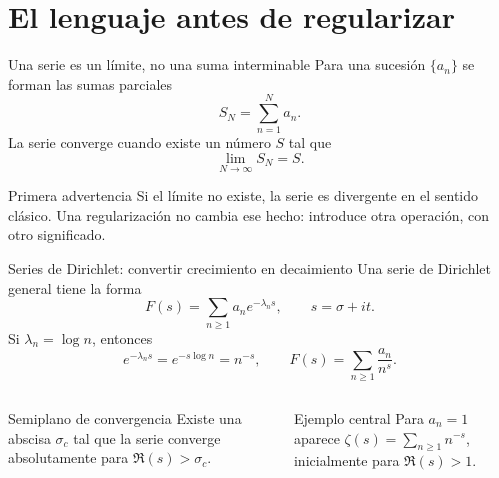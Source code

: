 \documentclass[aspectratio=169,11pt]{beamer}
\begin{document}
\section{El lenguaje antes de regularizar}

\begin{frame}{Una serie es un límite, no una suma interminable}
  \small
  Para una sucesión $\{a_n\}$ se forman las sumas parciales
  \[
    S_N=\sum_{n=1}^{N}a_n.
  \]
  \pause
  La serie converge cuando existe un número $S$ tal que
  \[
    \lim_{N\to\infty}S_N=S.
  \]
  \pause
  \begin{alertblock}{Primera advertencia}
    Si el límite no existe, la serie es divergente en el sentido clásico. Una
    regularización no cambia ese hecho: introduce otra operación, con otro significado.
  \end{alertblock}
\end{frame}

\begin{frame}{Series de Dirichlet: convertir crecimiento en decaimiento}
  Una serie de Dirichlet general tiene la forma
  \[
    F(s)=\sum_{n\ge1}a_n e^{-\lambda_n s},\qquad s=\sigma+it.
  \]
  \pause
  Si $\lambda_n=\log n$, entonces
  \[
    e^{-\lambda_ns}=e^{-s\log n}=n^{-s},
    \qquad F(s)=\sum_{n\ge1}\frac{a_n}{n^s}.
  \]
  \pause
  \begin{columns}[T,onlytextwidth]
      \begin{block}{Semiplano de convergencia}
        Existe una abscisa $\sigma_c$ tal que la serie converge absolutamente para
        $\Re(s)>\sigma_c$.
      \end{block}
      \pause
      \begin{block}{Ejemplo central}
        Para $a_n=1$ aparece
        $\displaystyle\zeta(s)=\sum_{n\ge1}n^{-s}$, inicialmente para $\Re(s)>1$.
      \end{block}
  \end{columns}
\end{frame}
\end{document}
